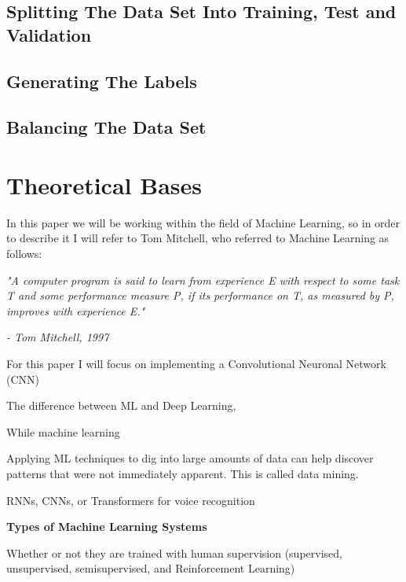 \documentclass[12pt, a4paper]{article}
\begin{document}
	\clearpage
	
	\subsection{Splitting The Data Set Into Training, Test and Validation}
	
	
	
	\clearpage
	
	\subsection{Generating The Labels}
	
	
	\clearpage
	
	\subsection{Balancing The Data Set}
	
	
	
	\clearpage
	
	\section{Theoretical Bases}
	
	In this paper we will be working within the field of Machine Learning, so in order to describe it I will refer to Tom Mitchell, who referred to Machine Learning as follows: 
	
	\textit{"A computer program is said to learn from experience E with respect to some task T and some performance measure P, if its performance on T, as measured by P, improves with experience E."}
	\begin{flushright}
	\textit{- Tom Mitchell, 1997 \cite{handsonmachinelearning}}
	\end{flushright}
	
	For this paper I will focus on implementing a Convolutional Neuronal Network (CNN) 
	
	The difference between ML and Deep Learning, 
	
	While machine learning 
	
	 Applying ML techniques to dig into large amounts of data can help discover patterns that were not immediately apparent. This is called data mining.
	 
	 RNNs, CNNs, or Transformers for voice recognition
	 
	 \textbf{Types of Machine Learning Systems}
	 
	 Whether or not they are trained with human supervision (supervised, unsupervised, semisupervised, and Reinforcement Learning)
	 
\end{document}
